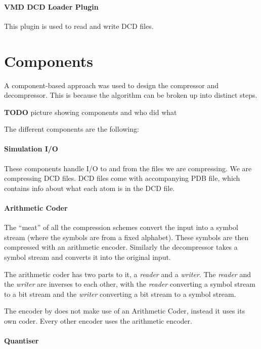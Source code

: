 \documentclass{report}
\newcommand{\todo}{\textbf{TODO} }
\begin{document}
\paragraph{VMD DCD Loader Plugin}
This plugin is used to read and write DCD files.


\section{Components}

A component-based approach was used to design the compressor and
decompressor. This is because the algorithm can be broken up into distinct
steps.

\todo picture showing components and who did what

The different components are the following:

\paragraph{Simulation I/O}

These components handle I/O to and from the files we are compressing. We are
compressing DCD files. DCD files come with accompanying PDB file, which
contains info about what each atom is in the DCD file.


\paragraph{Arithmetic Coder}

The ``meat'' of all the compression schemes convert the input into a symbol
stream (where the symbols are from a fixed alphabet). These symbols are then
compressed with an arithmetic encoder. Similarly the decompressor takes a
symbol stream and converts it into the original input.

The arithmetic coder has two parts to it, a \emph{reader} and a
\emph{writer}. The \emph{reader} and the \emph{writer} are inverses to each
other, with the \emph{reader} converting a symbol stream to a bit stream and
the \emph{writer} converting a bit stream to a symbol stream.

The encoder by \citep{omeltchenko2000sls} does not make use of an Arithmetic
Coder, instead it uses its own coder. Every other encoder uses the arithmetic
encoder.


\paragraph{Quantiser}
\end{document}
